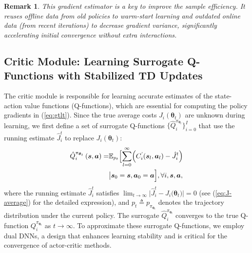 \documentclass{IEEEtran}
\newtheorem{remark}{Remark}
\begin{document}
\begin{remark}
This gradient estimator is a key to improve the sample efficiency. It reuses offline data from old policies to warm-start learning and outdated online data (from recent iterations) to decrease gradient variance, significantly accelerating initial convergence without extra interactions.

\end{remark}

\subsection{Critic Module: Learning Surrogate Q-Functions with Stabilized TD Updates}
The critic module is responsible for learning accurate estimates of the state-action value functions (Q-functions), which are essential for computing the policy gradients in (\ref{eq:gtlt}). Since the true average costs $J_{i}(\boldsymbol{\theta}_{t})$ are unknown during learning, we first define a set of surrogate Q-functions $\{\hat{Q}_{i}^{\pi_{\boldsymbol{\theta}_{t}}}\}_{i=0}^{I}$ that use the running estimate $\hat{J}_{i}^{t}$ to replace $J_{i}(\boldsymbol{\theta}_{t})$:
\begin{align}
\hat{Q}_{i}^{\pi_{\boldsymbol{\theta}_{t}}}\left(\boldsymbol{s},\boldsymbol{a}\right)= & \mathbb{E}_{p_{t}}\Bigl[\sum_{l=0}^{\infty}\Bigl(C_{i}^{\text{'}}(\boldsymbol{s}_{l},\boldsymbol{a}_{l})-\hat{J}_{i}^{t}\Bigr)\nonumber \\
& \bigl|\boldsymbol{s}_{0}=\boldsymbol{s},\boldsymbol{a}_{0}=\boldsymbol{a}\Bigr],\forall i,\boldsymbol{s},\boldsymbol{a},\label{eq:definition of Qhat}
\end{align}
where the running estimate $\hat{J}_{i}^{t}$ satisfies $\lim_{t\rightarrow\infty}\bigl|\hat{J}_{i}^{t}-J_{i}\bigl(\boldsymbol{\theta}_{t}\bigr)\bigr|=0$ (see (\ref{eq:J-average}) for the detailed expression), and $p_{t}\triangleq p_{\pi_{\boldsymbol{\theta}_{t}}}$ denotes the trajectory distribution under the current policy. The surrogate $\hat{Q}_{i}^{\pi_{\boldsymbol{\theta}_{t}}}$ converges to the true Q-function $Q_{i}^{\pi_{\boldsymbol{\theta}_{t}}}$ as $t\rightarrow\infty$. To approximate these surrogate Q-functions, we employ dual DNNs, a design that enhances learning stability and is critical for the convergence of actor-critic methods.
\end{document}
